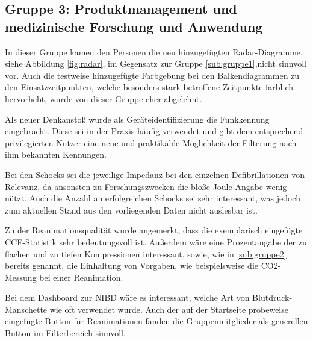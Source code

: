 \subsection{Gruppe 3: Produktmanagement und medizinische Forschung und Anwendung}
\label{sub:gruppe3}

In dieser Gruppe kamen den Personen die neu hinzugefügten Radar-Diagramme, siehe Abbildung \ref{fig:radar}, im Gegensatz zur Gruppe \ref{sub:gruppe1},nicht sinnvoll vor.
Auch die testweise hinzugefügte Farbgebung bei den Balkendiagrammen zu den Einsatzzeitpunkten, welche besonders stark betroffene Zeitpunkte farblich hervorhebt, wurde von dieser Gruppe eher abgelehnt.

Als neuer Denkanstoß wurde als Geräteidentifizierung die Funkkennung eingebracht.
Diese sei in der Praxis häufig verwendet und gibt dem entsprechend privilegierten Nutzer eine neue und praktikable Möglichkeit der Filterung nach ihm bekannten Kennungen.

Bei den Schocks sei die jeweilige Impedanz bei den einzelnen Defibrillationen von Relevanz, da ansonsten zu Forschungszwecken die bloße Joule-Angabe wenig nützt.
Auch die Anzahl an erfolgreichen Schocks sei sehr interessant, was jedoch zum aktuellen Stand aus den vorliegenden Daten nicht auslesbar ist.

Zu der Reanimationsqualität wurde angemerkt, dass die exemplarisch eingefügte \gls{CCF}-Statistik sehr bedeutungsvoll ist. 
Außerdem wäre eine Prozentangabe der zu flachen und zu tiefen Kompressionen interessant, sowie, wie in \ref{sub:gruppe2} bereits genannt, die Einhaltung von Vorgaben, wie beispielsweise die CO2-Messung bei einer Reanimation.

Bei dem Dashboard zur \gls{NIBD} wäre es interessant, welche Art von Blutdruck-Manschette wie oft verwendet wurde.
Auch der auf der Startseite probeweise eingefügte \gls{Button} für Reanimationen fanden die Gruppenmitglieder als generellen Button im Filterbereich sinnvoll.


